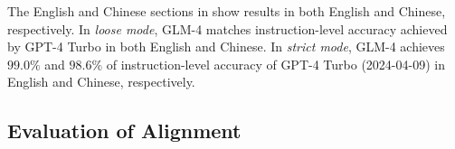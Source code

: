 \begin{table}[!ht]
    \centering
    \renewcommand{\arraystretch}{1.5}
    \caption{GLM-4 performance on IFEval~\cite{zhou2023instruction}, an LLM instruction following benchmark. `L` stands for `Loose` and `S` stands for `Strict`. `P` stands for `Prompt` and `I` stands for `Instruction`.}
    \vspace{1em}
    \label{tab:ifeval}
\end{table}

The English and Chinese sections in  show results in both English and Chinese, respectively.
In \emph{loose mode}, GLM-4 matches instruction-level accuracy achieved by GPT-4 Turbo in both English and Chinese.
In \emph{strict mode}, GLM-4 achieves $99.0\%$ and $98.6\%$ of instruction-level accuracy of GPT-4 Turbo (2024-04-09) in English and Chinese, respectively.


\subsection{Evaluation of Alignment}

